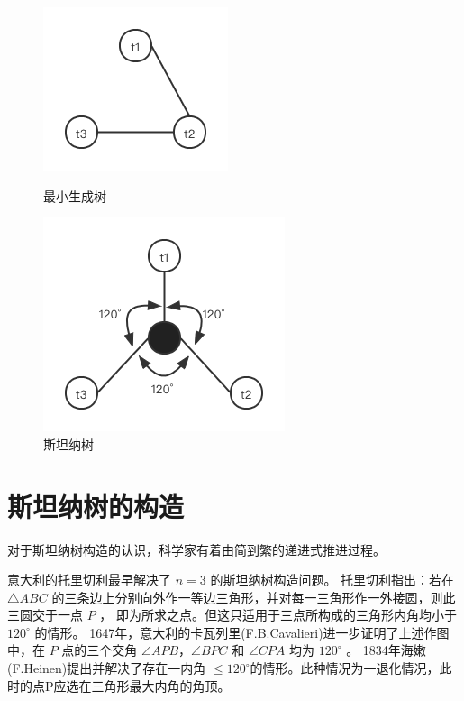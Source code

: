 \documentclass{SCIS2022cn}
\begin{document}
\begin{figure}
    \begin{minipage}[htbp]{0.5\linewidth}
        \centering
        \includegraphics[scale=0.5]{img/pic1.png}
        \caption{最小生成树}
        \label{pic1}
    \end{minipage}%
    \begin{minipage}[htbp]{0.5\linewidth}
        \centering
        \includegraphics[scale=0.5]{img/pic2.png}
        \caption{斯坦纳树}
        \label{pic2}
    \end{minipage}
\end{figure}

\section{斯坦纳树的构造}

对于斯坦纳树构造的认识，科学家有着由简到繁的递进式推进过程。

意大利的托里切利最早解决了 $n=3$ 的斯坦纳树构造问题。
托里切利指出：若在 $ \triangle  ABC$ 的三条边上分别向外作一等边三角形，并对每一三角形作一外接圆，则此三圆交于一点 $P$ ，
即为所求之点。但这只适用于三点所构成的三角形内角均小于 $120^{\circ}$ 的情形。
1647年，意大利的卡瓦列里(F.B.Cavalieri)进一步证明了上述作图中，在 $P$ 点的三个交角 $\angle  APB$，$\angle BPC$ 和 $\angle CPA$ 均为 $120^{\circ}$ 。
1834年海嫩(F.Heinen)提出并解决了存在一内角 $\leq  120^{\circ}$的情形。此种情况为一退化情况，此时的点P应选在三角形最大内角的角顶。
\end{document}
